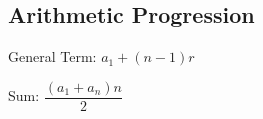 \subsection{Arithmetic Progression}

General Term: $ a_{1} + (n - 1) r $

Sum: $ \dfrac{(a_{1} + a_{n}) n}{2} $